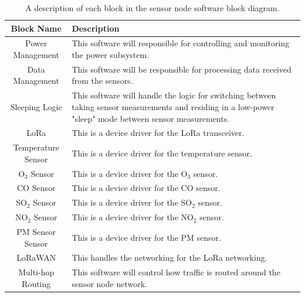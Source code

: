 \documentclass[titlepage, 11pt, letterpaper]{article}
\begin{document}
\begin{table}[]
    \centering
    \caption{A description of each block in the sensor node software block diagram.}
    \begin{tabularx}{\linewidth}{|c|X|}
        \hline
        Block Name & Description \\ 
        \hline
        Power Management & This software will responsible for controlling and monitoring the power subsystem.  \\\hline
        Data Management & This software will be responsible for processing data received from the sensors. \\\hline
        Sleeping Logic & This software will handle the logic for switching between taking sensor measurements and residing in a low-power "sleep" mode between sensor measurements. \\\hline
        LoRa & This is a device driver for the LoRa transceiver. \\\hline
        Temperature Sensor & This is a device driver for the temperature sensor. \\\hline
        O$_3$ Sensor & This is a device driver for the O$_3$ sensor. \\\hline
        CO Sensor & This is a device driver for the CO sensor. \\\hline
        SO$_2$ Sensor & This is a device driver for the SO$_2$ sensor. \\\hline
        NO$_2$ Sensor & This is a device driver for the NO$_2$ sensor. \\\hline
        PM Sensor Sensor & This is a device driver for the PM sensor. \\\hline
        LoRaWAN & This handles the networking for the LoRa networking. \\\hline
        Multi-hop Routing & This software will control how traffic is routed around the sensor node network. \\\hline
    \end{tabularx}
    \label{tab:descSWNodeBD}
\end{table}
\end{document}
